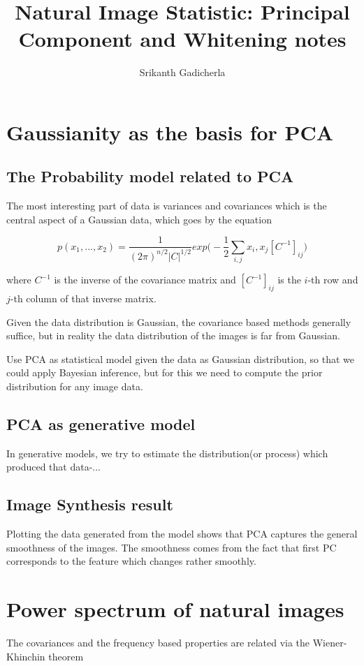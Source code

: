 \documentclass[12pt]{article}
\title{Natural Image Statistic: Principal Component and Whitening notes}
\author{Srikanth Gadicherla}
\begin{document}
\maketitle
\section{Gaussianity as the basis for PCA}
\subsection{The Probability model related to PCA}
The most interesting part of data is variances and covariances which is the central aspect of a Gaussian data, which goes by the equation 

\begin{equation}
p(x_1,...,x_2) = \dfrac{1}{(2\pi)^{n/2}|C|^{1/2}} exp\bigg(-\dfrac{1}{2} \sum_{i,j}x_i,x_j [C^{-1}]_{ij}\bigg)
\end{equation}

\noindent
where $C^{-1}$ is the inverse of the covariance matrix and $[C^{-1}]_{ij}$ is the $i$-th row and $j$-th column of that inverse matrix.

\noindent
Given the data distribution is Gaussian, the covariance based methods generally suffice, but in reality the data distribution of the images is far from Gaussian.  	

\noindent
Use PCA as statistical model given the data as Gaussian distribution, so that we could apply Bayesian inference, but for this we need to compute the prior distribution for any image data.

\subsection{PCA as generative model}

\noindent
In generative models, we try to estimate the distribution(or process) which produced that data-...

\subsection{Image Synthesis result}
\noindent
Plotting the data generated from the model shows that PCA captures the general smoothness of the images.
\noindent
The smoothness comes from the fact that first PC corresponds to the feature  which changes rather smoothly.

\section{Power spectrum of natural images}
The covariances and the frequency based properties are related via the Wiener-Khinchin theorem
\end{document}
